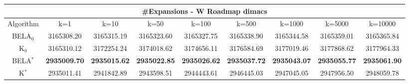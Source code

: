 \begin{tabular}{c|cccccccc}\toprule
\multicolumn{9}{c}{#Expansions - W Roadmap dimacs}\\ \midrule
Algorithm & k=1 & k=10 & k=50 & k=100 & k=500 & k=1000 & k=5000 & k=10000 \\ \midrule
BELA$_0$ & 3165308.20 & 3165315.19 & 3165323.60 & 3165327.75 & 3165338.90 & 3165344.58 & 3165359.01 & 3165365.84 \\
K$_0$ & 3165310.12 & 3172254.24 & 3174018.62 & 3174656.11 & 3176584.69 & 3177019.46 & 3177868.62 & 3177964.33 \\
BELA$^*$ & \textbf{2935009.70} & \textbf{2935015.62} & \textbf{2935022.85} & \textbf{2935026.62} & \textbf{2935037.72} & \textbf{2935043.07} & \textbf{2935055.77} & \textbf{2935061.90} \\
K$^*$ & 2935011.41 & 2941842.89 & 2943598.51 & 2944443.61 & 2946445.03 & 2947045.05 & 2947956.50 & 2948059.78 \\ \bottomrule 
\end{tabular}
